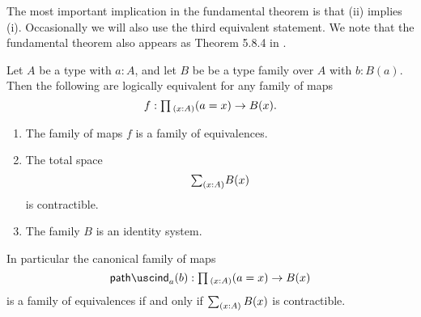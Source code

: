 The most important implication in the fundamental theorem is that (ii) implies (i). Occasionally we will also use the third equivalent statement. We note that the fundamental theorem also appears as Theorem 5.8.4 in \cite{hottbook}.

\begin{thm}\label{thm:id_fundamental}
Let $A$ be a type with $a:A$, and let $B$ be be a type family over $A$ with $b:B(a)$.
Then  the following are logically equivalent for any family of maps
\begin{equation*}
  f:\prd{x:A}(a=x)\to B(x).
\end{equation*}
\begin{enumerate}
\item The family of maps $f$ is a family of equivalences.
\item The total space
\begin{equation*}
\sm{x:A}B(x)
\end{equation*}
is contractible.
\item The family $B$ is an identity system.
\end{enumerate}
In particular the canonical family of maps
\begin{equation*}
\pathind_a(b):\prd{x:A} (a=x)\to B(x)
\end{equation*}
is a family of equivalences if and only if $\sm{x:A}B(x)$ is contractible.
\end{thm}

